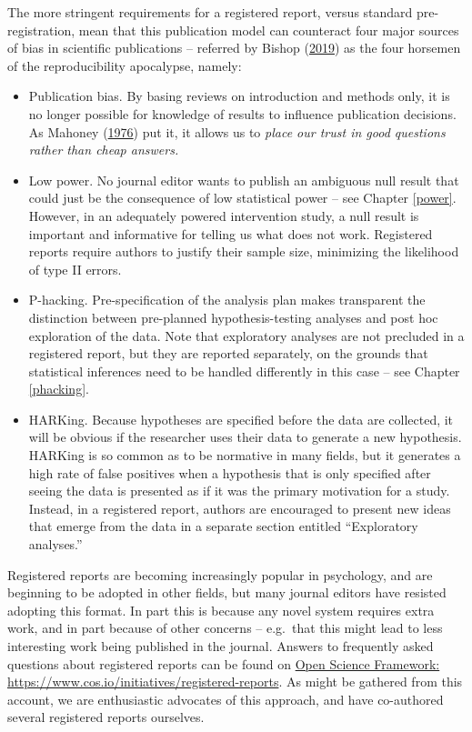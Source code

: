 \documentclass{krantz}
\begin{document}
The more stringent requirements for a registered report, versus standard pre-registration, mean that this publication model can counteract four major sources of bias in scientific publications -- referred by Bishop (\protect\hyperlink{ref-bishop2019}{2019}) as the four horsemen of the reproducibility apocalypse, namely:

\begin{itemize}
\item
  Publication bias. By basing reviews on introduction and methods only, it is no longer possible for knowledge of results to influence publication decisions. As Mahoney (\protect\hyperlink{ref-mahoney1976}{1976}) put it, it allows us to \emph{place our trust in good questions rather than cheap answers.}
\item
  Low power. No journal editor wants to publish an ambiguous null result that could just be the consequence of low statistical power -- see Chapter \ref{power}. However, in an adequately powered intervention study, a null result is important and informative for telling us what does not work. Registered reports require authors to justify their sample size, minimizing the likelihood of type II errors.
\item
  P-hacking. Pre-specification of the analysis plan makes transparent the distinction between pre-planned hypothesis-testing analyses and post hoc exploration of the data. Note that exploratory analyses are not precluded in a registered report, but they are reported separately, on the grounds that statistical inferences need to be handled differently in this case -- see Chapter \ref{phacking}.
\item
  HARKing. Because hypotheses are specified before the data are collected, it will be obvious if the researcher uses their data to generate a new hypothesis. HARKing is so common as to be normative in many fields, but it generates a high rate of false positives when a hypothesis that is only specified after seeing the data is presented as if it was the primary motivation for a study. Instead, in a registered report, authors are encouraged to present new ideas that emerge from the data in a separate section entitled ``Exploratory analyses.''
\end{itemize}

Registered reports are becoming increasingly popular in psychology, and are beginning to be adopted in other fields, but many journal editors have resisted adopting this format. In part this is because any novel system requires extra work, and in part because of other concerns -- e.g.~that this might lead to less interesting work being published in the journal. Answers to frequently asked questions about registered reports can be found on \href{https://www.cos.io/initiatives/registered-reports}{Open Science Framework: https://www.cos.io/initiatives/registered-reports}. As might be gathered from this account, we are enthusiastic advocates of this approach, and have co-authored several registered reports ourselves.
\end{document}
